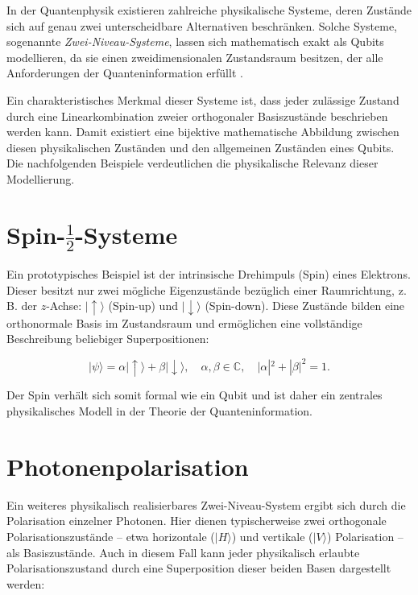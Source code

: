 In der Quantenphysik existieren zahlreiche physikalische Systeme, deren Zustände sich auf genau zwei unterscheidbare Alternativen beschränken. Solche Systeme, sogenannte \textit{Zwei-Niveau-Systeme}, lassen sich mathematisch exakt als Qubits modellieren, da sie einen zweidimensionalen Zustandsraum besitzen, der alle Anforderungen der Quanteninformation erfüllt \cite{nielsen2002quantum, sakurai1995modern}.

Ein charakteristisches Merkmal dieser Systeme ist, dass jeder zulässige Zustand durch eine Linearkombination zweier orthogonaler Basiszustände beschrieben werden kann. Damit existiert eine bijektive mathematische Abbildung zwischen diesen physikalischen Zuständen und den allgemeinen Zuständen eines Qubits. Die nachfolgenden Beispiele verdeutlichen die physikalische Relevanz dieser Modellierung.

\section*{Spin-$\frac{1}{2}$-Systeme}

Ein prototypisches Beispiel ist der intrinsische Drehimpuls (Spin) eines Elektrons. Dieser besitzt nur zwei mögliche Eigenzustände bezüglich einer Raumrichtung, z.\,B. der $z$-Achse: $|\uparrow\rangle$ (Spin-up) und $|\downarrow\rangle$ (Spin-down). Diese Zustände bilden eine orthonormale Basis im Zustandsraum und ermöglichen eine vollständige Beschreibung beliebiger Superpositionen:

\[
|\psi\rangle = \alpha |\uparrow\rangle + \beta |\downarrow\rangle, \quad \alpha, \beta \in \mathbb{C}, \quad |\alpha|^2 + |\beta|^2 = 1.
\]

Der Spin verhält sich somit formal wie ein Qubit und ist daher ein zentrales physikalisches Modell in der Theorie der Quanteninformation.

\section*{Photonenpolarisation}

Ein weiteres physikalisch realisierbares Zwei-Niveau-System ergibt sich durch die Polarisation einzelner Photonen. Hier dienen typischerweise zwei orthogonale Polarisationszustände – etwa horizontale ($|H\rangle$) und vertikale ($|V\rangle$) Polarisation – als Basiszustände. Auch in diesem Fall kann jeder physikalisch erlaubte Polarisationszustand durch eine Superposition dieser beiden Basen dargestellt werden:

